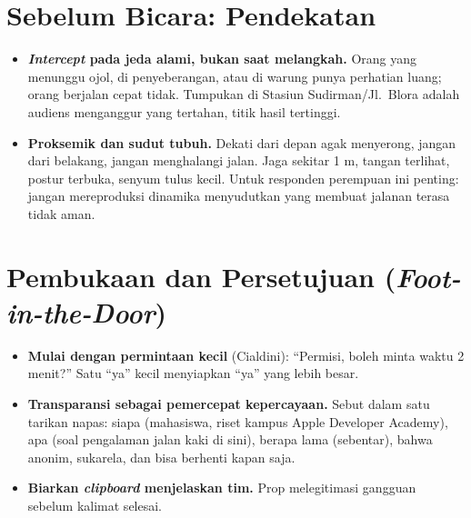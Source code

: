 \documentclass[11pt,a4paper]{report}
\begin{document}
\section{Sebelum Bicara: Pendekatan}
\begin{itemize}
  \item \textbf{\emph{Intercept} pada jeda alami, bukan saat melangkah.} Orang yang
    menunggu ojol, di penyeberangan, atau di warung punya perhatian luang; orang berjalan
    cepat tidak. Tumpukan di Stasiun Sudirman/Jl.\ Blora adalah audiens menganggur yang
    tertahan, titik hasil tertinggi.
  \item \textbf{Proksemik dan sudut tubuh.} Dekati dari depan agak menyerong, jangan dari
    belakang, jangan menghalangi jalan. Jaga sekitar 1 m, tangan terlihat, postur terbuka,
    senyum tulus kecil. Untuk responden perempuan ini penting: jangan mereproduksi dinamika
    menyudutkan yang membuat jalanan terasa tidak aman.
\end{itemize}

\section{Pembukaan dan Persetujuan (\emph{Foot-in-the-Door})}
\begin{itemize}
  \item \textbf{Mulai dengan permintaan kecil} (Cialdini): ``Permisi, boleh minta waktu
    2 menit?'' Satu ``ya'' kecil menyiapkan ``ya'' yang lebih besar.
  \item \textbf{Transparansi sebagai pemercepat kepercayaan.} Sebut dalam satu tarikan
    napas: siapa (mahasiswa, riset kampus Apple Developer Academy), apa (soal pengalaman
    jalan kaki di sini), berapa lama (sebentar), bahwa anonim, sukarela, dan bisa berhenti
    kapan saja.
  \item \textbf{Biarkan \emph{clipboard} menjelaskan tim.} Prop melegitimasi gangguan
    sebelum kalimat selesai.
\end{itemize}
\end{document}
